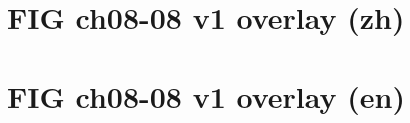 \documentclass[UTF8,fontset=fandol,10pt]{ctexart}
\begin{document}
\section*{FIG ch08-08 v1 overlay (zh)}

\newpage
\section*{FIG ch08-08 v1 overlay (en)}

\end{document}
